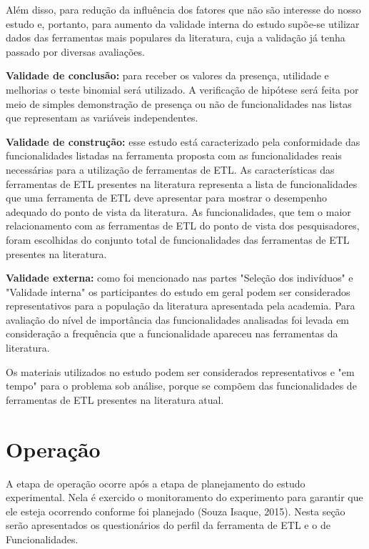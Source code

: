 Além disso, para redução da influência dos fatores que não são interesse do nosso estudo e, portanto, para aumento da validade interna do estudo supõe-se utilizar dados das ferramentas mais populares da literatura, cuja a validação já tenha passado por diversas avaliações.

\textbf{Validade de conclusão:} para receber os valores da presença, utilidade e melhorias o teste binomial será utilizado. A verificação de hipótese será feita por meio de simples demonstração de presença ou não de funcionalidades nas listas que representam as variáveis independentes.

\textbf{Validade de construção:} esse estudo está caracterizado pela conformidade das funcionalidades listadas na ferramenta proposta com as funcionalidades reais necessárias para a utilização de ferramentas de ETL. As características das ferramentas de ETL presentes na literatura representa a lista de funcionalidades que uma ferramenta de ETL deve apresentar para mostrar o desempenho adequado do ponto de vista da literatura. As funcionalidades, que tem o maior relacionamento com as ferramentas de ETL do ponto de vista dos pesquisadores, foram escolhidas do conjunto total de funcionalidades das ferramentas de ETL presentes na literatura.

\textbf{Validade externa:} como foi mencionado nas partes "Seleção dos indivíduos" e "Validade interna" os participantes do estudo em geral podem ser considerados representativos para a população da literatura apresentada pela academia. Para avaliação do nível de importância das funcionalidades analisadas foi levada em consideração a frequência que a funcionalidade apareceu nas ferramentas da literatura.

Os materiais utilizados no estudo podem ser considerados representativos e "em tempo" para o problema sob análise, porque se compõem das funcionalidades de ferramentas de ETL presentes na literatura atual.

\section{Operação}

A etapa de operação ocorre após a etapa de planejamento do estudo experimental. Nela é exercido o monitoramento do experimento para garantir que ele esteja ocorrendo conforme foi planejado (Souza Isaque, 2015). Nesta seção serão apresentados os questionários do perfil da ferramenta de ETL e o de Funcionalidades.

